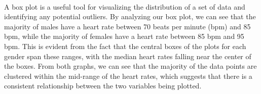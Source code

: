 \\
\hspace{\parindent}A box plot is a useful tool for visualizing the distribution of a set of data and identifying any potential outliers. By analyzing our box plot, we can see that the majority of males have a heart rate between 70 beats per minute (bpm) and 85 bpm, while the majority of females have a heart rate between 85 bpm and 95 bpm. This is evident from the fact that the central boxes of the plots for each gender span these ranges, with the median heart rates falling near the center of the boxes. From both graphs, we can see that the majority of the data points are clustered within the mid-range of the heart rates, which suggests that there is a consistent relationship between the two variables being plotted.
